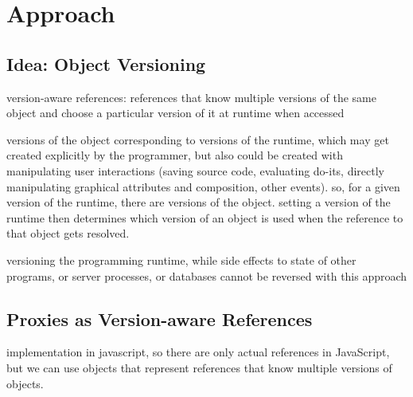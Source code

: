 \chapter{Approach} \label{sec:APPROACH}




\section{Idea: Object Versioning}

version-aware references: references that know multiple versions of the same object and choose a particular version of it at runtime when accessed 

versions of the object corresponding to versions of the runtime, which may get created explicitly by the programmer, but also could be created with manipulating user interactions (saving source code, evaluating do-its, directly manipulating graphical attributes and composition, other events). so, for a given version of the runtime, there are versions of the object. setting a version of the runtime then determines which version of an object is used when the reference to that object gets resolved.

versioning the programming runtime, while side effects to state of other programs, or server processes, or databases cannot be reversed with this approach 






% 
% 





\section{Proxies as Version-aware References}

implementation in javascript, so there are only actual references in JavaScript, but we can use objects that represent references that know multiple versions of objects.

